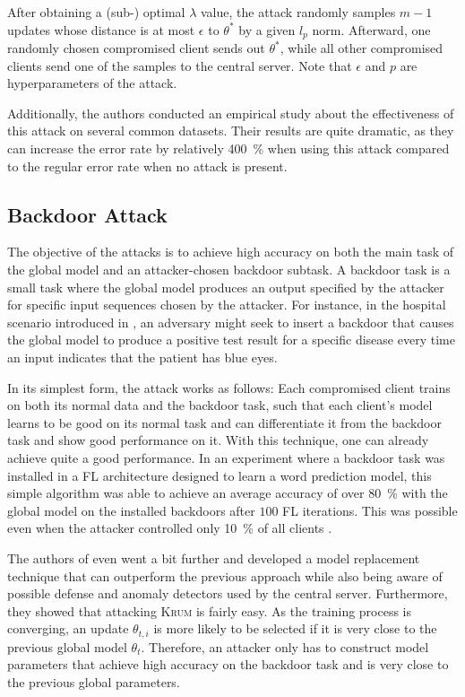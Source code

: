 \documentclass[conference]{IEEEtran}
\begin{document}
After obtaining a (sub-) optimal $\lambda$ value, the attack randomly samples $m-1$ updates whose distance is at most $\epsilon$ to $\theta^*$ by a given $l_p$ norm. Afterward, one randomly chosen compromised client sends out $\theta^*$, while all other compromised clients send one of the samples to the central server.
Note that $\epsilon$ and $p$ are hyperparameters of the attack.

Additionally, the authors conducted an empirical study about the effectiveness of this attack on several common datasets. Their results are quite dramatic, as they can increase the error rate by relatively \SI{400}{\percent} when using this attack compared to the regular error rate when no attack is present.

\subsection{Backdoor Attack}
The objective of the attacks is to achieve high accuracy on both the main task of the global model and an attacker-chosen backdoor subtask. A backdoor task is a small task where the global model produces an output specified by the attacker for specific input sequences chosen by the attacker. For instance, in the hospital scenario introduced in , an adversary might seek to insert a backdoor that causes the global model to produce a positive test result for a specific disease every time an input indicates that the patient has blue eyes.

In its simplest form, the attack works as follows:
Each compromised client trains on both its normal data and the backdoor task, such that each client's model learns to be good on its normal task and can differentiate it from the backdoor task and show good performance on it. With this technique, one can already achieve quite a good performance. In an experiment where a backdoor task was installed in a FL architecture designed to learn a word prediction model, this simple algorithm was able to achieve an average accuracy of over \SI{80}{\percent} with the global model on the installed backdoors after $100$ FL iterations. This was possible even when the attacker controlled only \SI{10}{\percent} of all clients \cite{Bagdasaryan2018}.

The authors of \cite{Bagdasaryan2018} even went a bit further and developed a model replacement technique that can outperform the previous approach while also being aware of possible defense and anomaly detectors used by the central server. Furthermore, they showed that attacking \textsc{Krum} is fairly easy. As the training process is converging, an update $\theta_{t, i}$ is more likely to be selected if it is very close to the previous global model $\theta_{t}$. Therefore, an attacker only has to construct model parameters that achieve high accuracy on the backdoor task and is very close to the previous global parameters.
\end{document}
